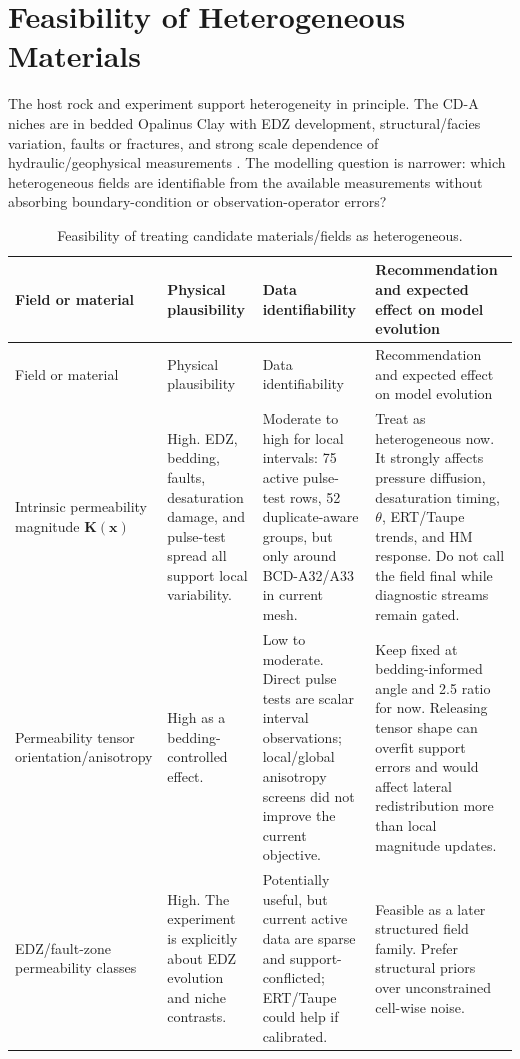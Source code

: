 \documentclass[10pt,a4paper]{article}
\newcommand{\K}{\bm K}
\newcommand{\thetaw}{\theta}
\begin{document}
\section{Feasibility of Heterogeneous Materials}

The host rock and experiment support heterogeneity in principle.  The CD-A niches are
in bedded Opalinus Clay with EDZ development, structural/facies variation, faults or
fractures, and strong scale dependence of hydraulic/geophysical measurements
\citep{Ziefle2021Sand,Ziefle2024Characterization,WaterContentEDZ2024}.  The
modelling question is narrower: which heterogeneous fields are identifiable from the
available measurements without absorbing boundary-condition or observation-operator
errors?

\begin{longtable}{@{}L{0.19\textwidth}L{0.18\textwidth}L{0.19\textwidth}Y@{}}
\caption{Feasibility of treating candidate materials/fields as heterogeneous.}\\
\toprule
Field or material & Physical plausibility & Data identifiability & Recommendation and expected effect on model evolution \\
\midrule
\endfirsthead
\toprule
Field or material & Physical plausibility & Data identifiability & Recommendation and expected effect on model evolution \\
\midrule
\endhead
\bottomrule
\endlastfoot
Intrinsic permeability magnitude \(\K(\bm x)\) & High.  EDZ, bedding, faults, desaturation damage, and pulse-test spread all support local variability. & Moderate to high for local intervals: 75 active pulse-test rows, 52 duplicate-aware groups, but only around BCD-A32/A33 in current mesh. & Treat as heterogeneous now.  It strongly affects pressure diffusion, desaturation timing, \(\thetaw\), ERT/Taupe trends, and HM response.  Do not call the field final while diagnostic streams remain gated. \\
Permeability tensor orientation/anisotropy & High as a bedding-controlled effect. & Low to moderate.  Direct pulse tests are scalar interval observations; local/global anisotropy screens did not improve the current objective. & Keep fixed at bedding-informed angle and 2.5 ratio for now.  Releasing tensor shape can overfit support errors and would affect lateral redistribution more than local magnitude updates. \\
EDZ/fault-zone permeability classes & High.  The experiment is explicitly about EDZ evolution and niche contrasts. & Potentially useful, but current active data are sparse and support-conflicted; ERT/Taupe could help if calibrated. & Feasible as a later structured field family.  Prefer structural priors over unconstrained cell-wise noise. \\

\end{longtable}
\end{document}

